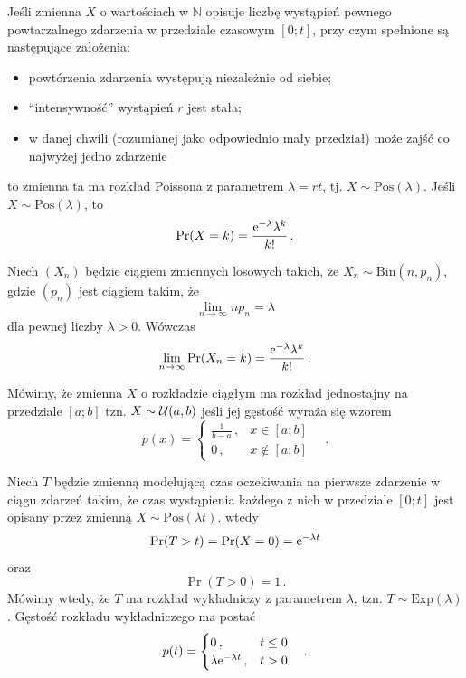 \documentclass{myclass}
\numberwithin{equation}{subsection}
\begin{document}
\begin{definition}
Jeśli zmienna \(X\) o wartościach w \(\mathbb{N}\) opisuje liczbę wystąpień pewnego powtarzalnego
zdarzenia w przedziale czasowym \([0;t]\), przy czym spełnione są następujące założenia:
\begin{itemize}
\item powtórzenia zdarzenia występują niezależnie od siebie;    
\item \enquote{intensywność} wystąpień \(r\) jest stała;
\item w danej chwili (rozumianej jako odpowiednio mały przedział) może zajść co najwyżej jedno
zdarzenie
\end{itemize}

to zmienna ta ma rozkład Poissona z parametrem \(\lambda = rt\), tj. \(X \sim
\mathrm{Pos}(\lambda)\). Jeśli \(X \sim \mathrm{Pos}(\lambda)\), to
\[
\Pr(X = k) = \frac{\mathrm{e}^{-\lambda} \lambda^k}{k!}\,.
\]
\end{definition}

\begin{theorem}[Poissona]
Niech \((X_n)\) będzie ciągiem zmiennych losowych takich, że \(X_n \sim \mathrm{Bin}(n, p_n)\),
gdzie \((p_n)\) jest ciągiem takim, że
\[
\lim_{n \to \infty} n p_n = \lambda
\]
dla pewnej liczby \(\lambda > 0\). Wówczas
\[
\lim_{n \to \infty} \Pr(X_n = k) = \frac{\mathrm{e}^{-\lambda} \lambda^k}{k!}\,.
\]
\end{theorem}

\begin{definition}
Mówimy, że zmienna \(X\) o rozkładzie ciągłym ma rozkład jednostajny na przedziale \([a;b]\) tzn.
\(X \sim \mathcal{U}(a,b)\) jeśli jej gęstość wyraża się wzorem
\[
p(x) = \begin{cases}
    \frac{1}{b - a}\,, &x\in[a;b]\\
    0\,,&x\notin[a;b]
\end{cases}\quad.
\]
\end{definition}

\begin{definition}
Niech \(T\) będzie zmienną modelującą czas oczekiwania na pierwsze zdarzenie w ciągu zdarzeń takim,
że czas wystąpienia każdego z nich w przedziale \([0;t]\) jest opisany przez zmienną \(X \sim
\mathrm{Pos}(\lambda t)\). wtedy
\[
\Pr(T > t) = \Pr(X = 0) = \mathrm{e}^{-\lambda t}
\]
oraz
\[
\Pr(T > 0) = 1\,.
\]
Mówimy wtedy, że \(T\) ma rozkład wykładniczy z parametrem \(\lambda\), tzn. \(T \sim
\mathrm{Exp}(\lambda)\). Gęstość rozkładu wykładniczego ma postać
\[
p(t) = \begin{cases}
    0\,,&t \leq 0\\
    \lambda \mathrm{e}^{-\lambda t}\,,&t > 0
\end{cases}\quad.
\]
\end{definition}
\end{document}
